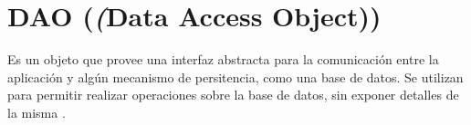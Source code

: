 \section{DAO (\textit(Data Access Object))}

Es un objeto que provee una interfaz abstracta para la comunicación entre la aplicación y algún mecanismo de persitencia, como una base de datos. Se utilizan para permitir realizar operaciones sobre la base de datos, sin exponer detalles de la misma \cite{DAO0}.